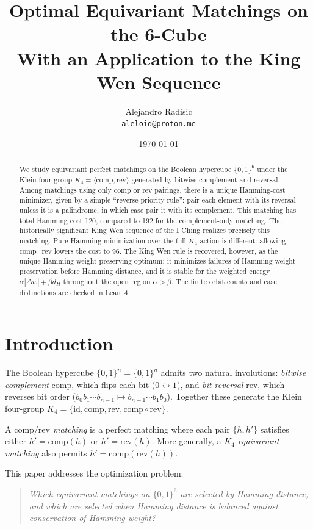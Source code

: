 \documentclass[11pt]{article}
\title{\textbf{Optimal Equivariant Matchings on the 6-Cube}\\[0.3em]
\large With an Application to the King Wen Sequence}
\author{Alejandro Radisic\\[0.3em]\texttt{aleloid@proton.me}}
\date{\today}
\theoremstyle{definition}
\theoremstyle{plain}
\newcommand{\B}{\{0,1\}}
\newcommand{\comp}{\mathrm{comp}}
\newcommand{\rev}{\mathrm{rev}}
\begin{document}
\maketitle

\begin{abstract}
We study equivariant perfect matchings on the Boolean hypercube $\B^6$ under the Klein four-group $K_4 = \langle \comp, \rev \rangle$ generated by bitwise complement and reversal. Among matchings using only $\comp$ or $\rev$ pairings, there is a unique Hamming-cost minimizer, given by a simple ``reverse-priority rule'': pair each element with its reversal unless it is a palindrome, in which case pair it with its complement. This matching has total Hamming cost 120, compared to 192 for the complement-only matching. The historically significant King Wen sequence of the I Ching realizes precisely this matching. Pure Hamming minimization over the full $K_4$ action is different: allowing $\comp \circ \rev$ lowers the cost to 96. The King Wen rule is recovered, however, as the unique Hamming-weight-preserving optimum: it minimizes failures of Hamming-weight preservation before Hamming distance, and it is stable for the weighted energy $\alpha|\Delta w|+\beta d_H$ throughout the open region $\alpha>\beta$. The finite orbit counts and case distinctions are checked in Lean~4.
\end{abstract}

\section{Introduction}

The Boolean hypercube $\B^n = \{0,1\}^n$ admits two natural involutions: \emph{bitwise complement} $\comp$, which flips each bit ($0 \leftrightarrow 1$), and \emph{bit reversal} $\rev$, which reverses bit order ($b_0 b_1 \cdots b_{n-1} \mapsto b_{n-1} \cdots b_1 b_0$). Together these generate the Klein four-group $K_4 = \{\mathrm{id}, \comp, \rev, \comp \circ \rev\}$.

A \emph{$\comp/\rev$ matching} is a perfect matching where each pair $\{h, h'\}$ satisfies either $h' = \comp(h)$ or $h' = \rev(h)$. More generally, a \emph{$K_4$-equivariant matching} also permits $h' = \comp(\rev(h))$.

This paper addresses the optimization problem:
\begin{quote}
\emph{Which equivariant matchings on $\B^6$ are selected by Hamming distance, and which are selected when Hamming distance is balanced against conservation of Hamming weight?}
\end{quote}
\end{document}
